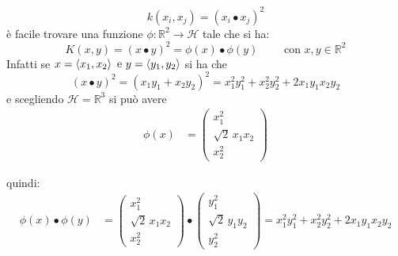  \begin{equation*}
 k(x_i,x_j) = (x_i \bullet x_j)^2
 \end{equation*}
 è facile trovare una funzione $\phi : \mathbb{R}^2 \to \mathcal{H}$ tale che si ha:
\begin{equation*}
 K(x,y) = (x \bullet y)^2 = \phi(x) \bullet \phi(y) \qquad \text{ con } x,y \in \mathbb{R}^2
\end{equation*}
Infatti se $x=\braket{x_1 , x_2} \text{ e } y=\braket{y_1 , y_2}$ si ha che
\begin{equation}
\label{eq:kernelex}
(x \bullet y)^2 = (x_1y_1 + x_2y_2)^2 = x_{1}^{2}y_{1}^{2} + x_{2}^{2}y_{2}^{2} + 2x_{1}y_{1}x_{2}y_{2}
\end{equation}
e scegliendo $\mathcal{H} = \mathbb{R}^3$ si può avere
 \begin{align*}
    \phi(x) &= \begin{pmatrix}
           x_{1}^2 \\
           \sqrt{2}\,x_{1}x_{2} \\
           x_{2}^2
         \end{pmatrix}
  \end{align*}
 
  quindi:
 \begin{align*}
    \phi(x) \bullet \phi(y) &= \begin{pmatrix}
           x_{1}^2 \\
           \sqrt{2}\,x_{1}x_{2} \\
           x_{2}^2
         \end{pmatrix}\bullet
         \begin{pmatrix}
           y_{1}^2 \\
           \sqrt{2}\,y_{1}y_{2} \\
           y_{2}^2
         \end{pmatrix} = x_{1}^{2}y_{1}^{2} + x_{2}^{2}y_{2}^{2} + 2x_{1}y_{1}x_{2}y_{2}
  \end{align*}

